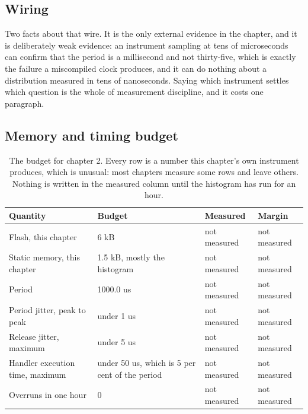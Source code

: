 \subsection*{Wiring}


Two facts about that wire. It is the only external evidence in the chapter, and
it is deliberately weak evidence: an instrument sampling at tens of microseconds
can confirm that the period is a millisecond and not thirty-five, which is
exactly the failure a miscompiled clock produces, and it can do nothing about a
distribution measured in tens of nanoseconds. Saying which instrument settles
which question is the whole of measurement discipline, and it costs one
paragraph.

\subsection*{Memory and timing budget}

\begin{table}[H]\centering\small
\begin{tabular}{p{44mm}p{28mm}p{28mm}p{30mm}}
\toprule
Quantity & Budget & Measured & Margin \\
\midrule
Flash, this chapter & 6 kB & not measured & not measured \\
Static memory, this chapter & 1.5 kB, mostly the histogram & not measured & not measured \\
Period & 1000.0 us & not measured & not measured \\
Period jitter, peak to peak & under 1 us & not measured & not measured \\
Release jitter, maximum & under 5 us & not measured & not measured \\
Handler execution time, maximum & under 50 us, which is 5 per cent of the period & not measured & not measured \\
Overruns in one hour & 0 & not measured & not measured \\
\bottomrule
\end{tabular}
\caption{The budget for chapter 2. Every row is a number this chapter's own instrument produces, which is unusual: most chapters measure some rows and leave others. Nothing is written in the measured column until the histogram has run for an hour.}
\end{table}

